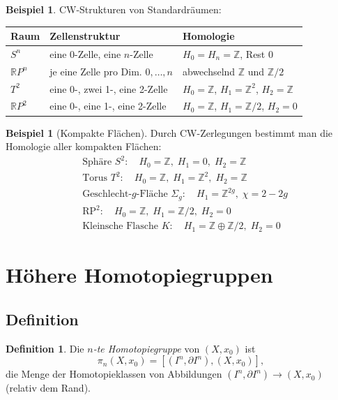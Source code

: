 \documentclass[12pt,a4paper]{amsart}
\theoremstyle{definition}
\newtheorem{definition}[theorem]{Definition}
\newtheorem{example}[theorem]{Beispiel}
\begin{document}
\begin{example}
CW-Strukturen von Standardr\"aumen:
\begin{center}
\begin{tabular}{lll}
\toprule
Raum & Zellenstruktur & Homologie \\
\midrule
$S^n$ & eine 0-Zelle, eine $n$-Zelle & $H_0 = H_n = \mathbb{Z}$, Rest 0 \\
$\mathbb{R}P^n$ & je eine Zelle pro Dim. $0,\ldots,n$ & abwechselnd $\mathbb{Z}$ und $\mathbb{Z}/2$ \\
$T^2$ & eine 0-, zwei 1-, eine 2-Zelle & $H_0=\mathbb{Z}$, $H_1=\mathbb{Z}^2$, $H_2=\mathbb{Z}$ \\
$\mathbb{R}P^2$ & eine 0-, eine 1-, eine 2-Zelle & $H_0=\mathbb{Z}$, $H_1=\mathbb{Z}/2$, $H_2=0$ \\
\bottomrule
\end{tabular}
\end{center}
\end{example}

\begin{example}[Kompakte Fl\"achen]
Durch CW-Zerlegungen bestimmt man die Homologie aller kompakten Fl\"achen:
\begin{align*}
  &\text{Sph\"are } S^2:\quad H_0=\mathbb{Z},\; H_1=0,\; H_2=\mathbb{Z} \\
  &\text{Torus } T^2:\quad H_0=\mathbb{Z},\; H_1=\mathbb{Z}^2,\; H_2=\mathbb{Z} \\
  &\text{Geschlecht-}g\text{-Fl\"ache } \Sigma_g:\quad H_1=\mathbb{Z}^{2g},\; \chi=2-2g \\
  &\text{RP}^2:\quad H_0=\mathbb{Z},\; H_1=\mathbb{Z}/2,\; H_2=0 \\
  &\text{Kleinsche Flasche } K:\quad H_1=\mathbb{Z}\oplus\mathbb{Z}/2,\; H_2=0
\end{align*}
\end{example}

\section{H\"ohere Homotopiegruppen}
\label{sec:hoehere}

\subsection{Definition}

\begin{definition}
Die \emph{$n$-te Homotopiegruppe} von $(X, x_0)$ ist
\[
  \pi_n(X, x_0) = [(I^n, \partial I^n), (X, x_0)],
\]
die Menge der Homotopieklassen von Abbildungen
$(I^n, \partial I^n) \to (X, x_0)$ (relativ dem Rand).
\end{definition}
\end{document}
